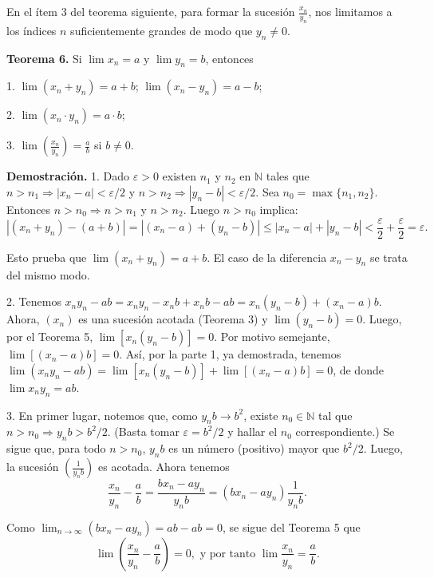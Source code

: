 \documentclass[12pt,oneside]{book}
\begin{document}
En el ítem 3 del teorema siguiente, para formar la sucesión \(\frac{x_n}{y_n}\), nos limitamos a los índices \(n\) suficientemente grandes de modo que \(y_n \neq 0\).

\textbf{Teorema 6.} Si \(\lim x_n = a\) y \(\lim y_n = b\), entonces

1. \(\lim(x_n + y_n) = a + b\); \(\lim(x_n - y_n) = a - b\);

2. \(\lim(x_n \cdot y_n) = a \cdot b\);

3. \(\lim\left(\frac{x_n}{y_n}\right) = \frac{a}{b}\) si \(b \neq 0\).

\textbf{Demostración.} 1. Dado \(\varepsilon > 0\) existen \(n_1\) y \(n_2\) en \(\mathbb{N}\) tales que \(n > n_1 \Rightarrow |x_n - a| < \varepsilon/2\) y \(n > n_2 \Rightarrow |y_n - b| < \varepsilon/2\). Sea \(n_0 = \max\{n_1, n_2\}\). Entonces \(n > n_0 \Rightarrow n > n_1\) y \(n > n_2\). Luego \(n > n_0\) implica:
\[
|(x_n + y_n) - (a + b)| = |(x_n - a) + (y_n - b)| \leq |x_n - a| + |y_n - b| < \frac{\varepsilon}{2} + \frac{\varepsilon}{2} = \varepsilon.
\]

Esto prueba que \(\lim(x_n + y_n) = a + b\). El caso de la diferencia \(x_n - y_n\) se trata del mismo modo.

2. Tenemos \(x_n y_n - ab = x_n y_n - x_n b + x_n b - ab = x_n (y_n - b) + (x_n - a) b\). Ahora, \((x_n)\) es una sucesión acotada (Teorema 3) y \(\lim(y_n - b) = 0\). Luego, por el Teorema 5, \(\lim[x_n(y_n - b)] = 0\). Por motivo semejante, \(\lim[(x_n - a)b] = 0\). Así, por la parte 1, ya demostrada, tenemos \(\lim(x_n y_n - ab) = \lim[x_n(y_n - b)] + \lim[(x_n - a)b] = 0\), de donde \(\lim x_n y_n = ab\).

3. En primer lugar, notemos que, como \(y_n b \to b^2\), existe \(n_0 \in \mathbb{N}\) tal que \(n > n_0 \Rightarrow y_n b > b^2/2\). (Basta tomar \(\varepsilon = b^2/2\) y hallar el \(n_0\) correspondiente.) Se sigue que, para todo \(n > n_0\), \(y_n b\) es un número (positivo) mayor que \(b^2/2\). Luego, la sucesión \(\left(\frac{1}{y_n b}\right)\) es acotada. Ahora tenemos
\[
\frac{x_n}{y_n} - \frac{a}{b} = \frac{b x_n - a y_n}{y_n b} = (b x_n - a y_n) \frac{1}{y_n b}.
\]

Como \(\lim_{n \to \infty} (b x_n - a y_n) = ab - ab = 0\), se sigue del Teorema 5 que
\[
\lim\left(\frac{x_n}{y_n} - \frac{a}{b}\right) = 0, \text{ y por tanto } \lim\frac{x_n}{y_n} = \frac{a}{b}.
\]
\end{document}
